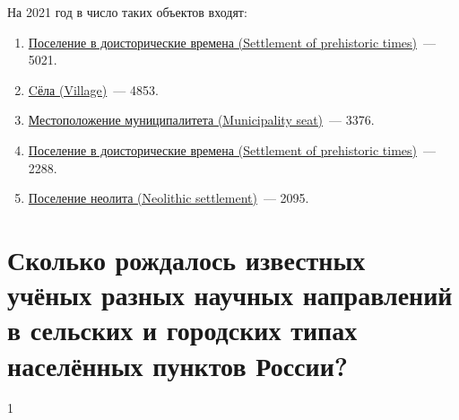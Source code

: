 На 2021 год в число таких объектов входят:
\begin{enumerate} 
  \item \href{http://www.wikidata.org/entity/Q106505070}{Поселение в доисторические времена (Settlement of prehistoric times)}~--- \num{5021}.
  \item \href{http://www.wikidata.org/entity/Q532}{Cёла (Village)}~--- \num{4853}.
  \item \href{http://www.wikidata.org/entity/Q15303838}{Местоположение муниципалитета (Municipality seat)}~--- \num{3376}.
  \item \href{http://www.wikidata.org/entity/Q106492558}{Поселение в доисторические времена (Settlement of prehistoric times)}~--- \num{2288}.
  \item \href{http://www.wikidata.org/entity/Q106491339}{Поселение неолита (Neolithic settlement)}~--- \num{2095}.
\end{enumerate}

\section{Сколько рождалось известных учёных разных научных направлений в сельских и городских типах населённых пунктов России?}

1

